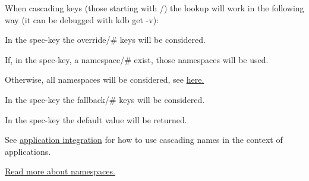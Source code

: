 When cascading keys (those starting with {\ttfamily /}) the lookup will work in the following way (it can be debugged with {\ttfamily kdb get -\/v})\+:


\begin{DoxyEnumerate}
\item In the {\ttfamily spec}-\/key the {\ttfamily override/\#} keys will be considered.
\item If, in the {\ttfamily spec}-\/key, a {\ttfamily namespace/\#} exist, those namespaces will be used.
\item Otherwise, all namespaces will be considered, see \hyperlink{md_doc_help_elektra-namespaces_doc_help_elektra-namespaces_md}{here.}
\item In the {\ttfamily spec}-\/key the {\ttfamily fallback/\#} keys will be considered.
\item In the {\ttfamily spec}-\/key the {\ttfamily default} value will be returned.
\end{DoxyEnumerate}

See \hyperlink{doc_tutorials_application-integration_md}{application integration} for how to use cascading names in the context of applications.

\hyperlink{md_doc_help_elektra-namespaces_doc_help_elektra-namespaces_md}{Read more about namespaces.} 